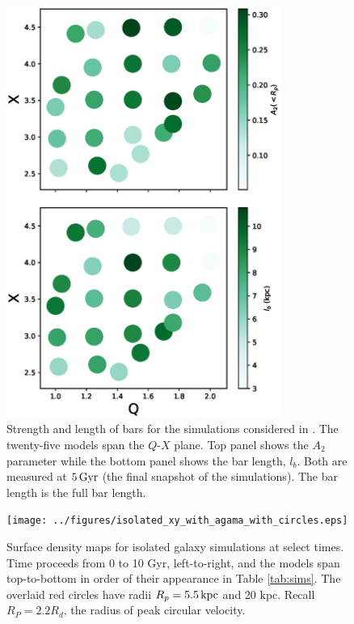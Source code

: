 \begin{figure}
	\centering
	\includegraphics[width=0.8\textwidth]{../figures/wpd.eps}
	\caption{Strength and length of bars for the simulations
          considered in \citet{WPDGalactICSReference}.  The twenty-five models
          span the $Q$-$X$ plane.  Top panel shows the $A_2$ parameter
          while the bottom panel shows the bar length, $l_b$.  Both are
          measured at $5\,{\rm Gyr}$ (the final snapshot of the
          simulations). {The bar length is the full bar length.}}
	\label{fig:qxa2}
\end{figure}


\begin{figure}
	\centering
	\texttt{[image: ../figures/isolated\_xy\_with\_agama\_with\_circles.eps]}
	\caption{Surface density maps for isolated galaxy simulations
          at select times. Time proceeds from 0 to 10 Gyr,
          left-to-right, and the models span top-to-bottom in order of
          their appearance in Table \ref{tab:sims}. The overlaid red
          circles have radii $R_p=5.5\,{\rm kpc}$ and 20 kpc. {Recall $R_P=2.2 R_d$, the 
          radius of peak circular velocity.}}
	\label{fig:face_on_isolated}
\end{figure}

